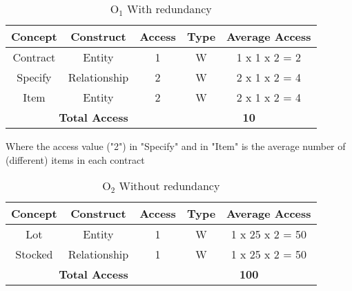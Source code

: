 \begin{table}[!h]\caption{	$ \textrm{O}_\textrm{1} $ With redundancy}
	\begin{center}
		\begin{tabular}{| c | c | c | c | c |}
			\hline
			\textbf{Concept} & \textbf{Construct} & \textbf{Access} & \textbf{Type} & \textbf{Average Access} \\ \hline
			Contract & Entity & 1 & W & 1 x 1 x 2 = 2 \\ \hline
			Specify & Relationship & 2 & W & 2 x 1 x 2 = 4 \\ \hline
			Item & Entity & 2 & W & 2 x 1 x 2 = 4 \\ \hline
			\multicolumn{3}{|c|}{\textbf{Total Access}} & \multicolumn{2}{|c|}{\textbf{10}} \\ \hline
		\end{tabular}
	\end{center}
\end{table}

Where the access value ("2") in "Specify" and in "Item" is the average number of (different) items in each contract

\begin{table}[!h]\caption{	$ \textrm{O}_\textrm{2} $ Without redundancy}
	\begin{center}
		\begin{tabular}{| c | c | c | c | c |}
			\hline
			\textbf{Concept} & \textbf{Construct} & \textbf{Access} & \textbf{Type} & \textbf{Average Access} \\ \hline
			Lot & Entity & 1 & W & 1 x 25 x 2 = 50 \\ \hline
			Stocked & Relationship & 1 & W & 1 x 25 x 2 = 50 \\ \hline
			\multicolumn{3}{|c|}{\textbf{Total Access}} & \multicolumn{2}{|c|}{\textbf{100}} \\ \hline
		\end{tabular}
	\end{center}
\end{table}



